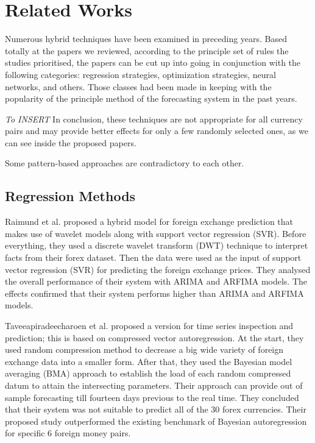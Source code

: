 \section{Related Works}

Numerous hybrid techniques have been examined in preceding years. Based totally at the papers we reviewed, according to the principle set of rules the studies prioritised, the papers can be cut up into going in conjunction with the following categories: regression strategies, optimization strategies, neural networks, and others. Those classes had been made in keeping with the popularity of the principle method of the forecasting system in the past years.

\textit{To INSERT}
In conclusion, these techniques are not appropriate for all currency pairs and may provide better effects for only a few randomly selected ones, as we can see inside the proposed papers.

Some pattern-based approaches are contradictory to each other.

\subsection{Regression Methods}

Raimund et al. \cite{Raimundo18} proposed a hybrid model for foreign exchange prediction that makes use of wavelet models along with support vector regression (SVR). Before everything, they used a discrete wavelet transform (DWT) technique to interpret facts from their forex dataset. Then the data were used as the input of support vector regression (SVR) for predicting the foreign exchange prices. They analysed the overall performance of their system with ARIMA and ARFIMA models. The effects confirmed that their system performs higher than ARIMA and ARFIMA models. 

Taveeapiradeecharoen et al. \citep{Taveeapiradeecharoen19} proposed a version for time series inspection and prediction; this is based on compressed vector autoregression. At the start, they used random compression method to decrease a big wide variety of foreign exchange data into a smaller form. After that, they used the Bayesian model averaging (BMA) approach to establish the load of each random compressed datum to attain the intersecting parameters. Their approach can provide out of sample forecasting till fourteen days previous to the real time. They concluded that their system was not suitable to predict all of the 30 forex currencies. Their proposed study outperformed the existing benchmark of Bayesian autoregression for specific 6 foreign money pairs. 

